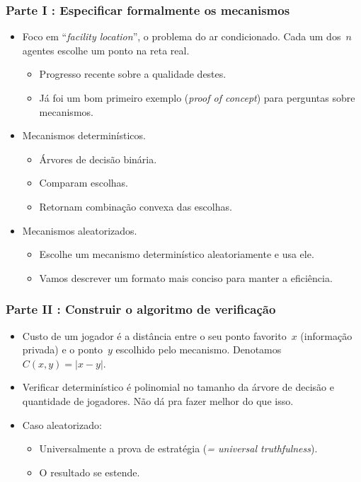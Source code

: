 \documentclass{beamer}
\begin{document}
\begin{frame}
\frametitle{Parte I : Especificar formalmente os mecanismos}
\begin{itemize}
\item Foco em ``\textit{facility location}'', o problema do ar condicionado. Cada um dos~$n$ agentes escolhe um ponto na reta real.
\begin{itemize}
    \item Progresso recente sobre a qualidade destes.
    \item Já foi um bom primeiro exemplo (\textit{proof of concept}) para perguntas sobre mecanismos.
\end{itemize}
\pause
\item Mecanismos determinísticos.
\begin{itemize}
    \item Árvores de decisão binária.
    \item Comparam escolhas.
    \item Retornam combinação convexa das escolhas.
\end{itemize}
\item Mecanismos aleatorizados.
\begin{itemize}
    \item Escolhe um mecanismo determinístico aleatoriamente e usa ele.
    \item Vamos descrever um formato mais conciso para manter a eficiência.
\end{itemize}
\end{itemize}
\end{frame}

\begin{frame}
\frametitle{Parte II : Construir o algoritmo de verificação}
\begin{itemize}
\item Custo de um jogador é a distância entre o seu ponto favorito~$x$ (informação privada) e o ponto~$y$ escolhido pelo mecanismo. Denotamos~$C(x,y) = |x-y|$.
\item Verificar determinístico é polinomial no tamanho da árvore de decisão e quantidade de jogadores. Não dá pra fazer melhor do que isso.
\item Caso aleatorizado:
\begin{itemize}
    \item Universalmente a prova de estratégia (\textit{= universal truthfulness}).
    \item O resultado se estende.
\end{itemize}
\end{itemize}
\end{frame}
\end{document}
